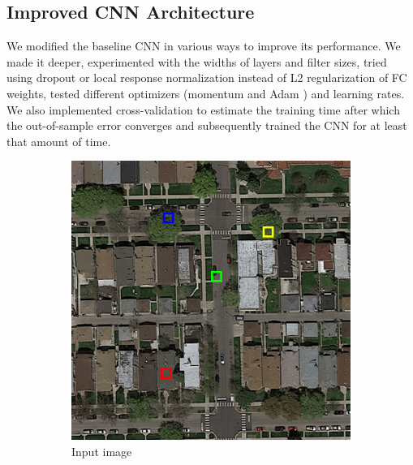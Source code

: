 \documentclass[10pt,conference,compsocconf]{IEEEtran}
\begin{document}
\subsection{Improved CNN Architecture}
\label{subsec:CNN}
We modified the baseline CNN in various ways to improve its performance. We made it deeper, experimented with the widths of layers and filter sizes, tried using dropout or local response normalization instead of L2 regularization of FC weights, tested different optimizers (momentum and Adam \cite{Adam.2014}) and learning rates. We also implemented cross-validation to estimate the training time after which the out-of-sample error converges and subsequently trained the CNN for at least that amount of time.

\begin{figure}
	\centering
	\begin{subfigure}[t]{.15\textwidth}
		\includegraphics[width=1\textwidth]{figs/context_size/full_img}
		\caption{Input image}
	\end{subfigure}
	\begin{subfigure}[t]{.15\textwidth}

\end{subfigure}
\end{figure}
\end{document}
